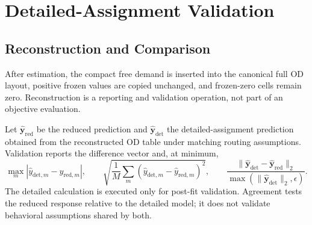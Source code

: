 
\section{Detailed-Assignment Validation}
\subsection{Reconstruction and Comparison}

After estimation, the compact free demand is inserted into the canonical full
OD layout, positive frozen values are copied unchanged, and frozen-zero cells
remain zero. Reconstruction is a reporting and validation operation, not part
of an objective evaluation.

Let $\widehat{\bm y}_{\mathrm{red}}$ be the reduced prediction and
$\widehat{\bm y}_{\mathrm{det}}$ the detailed-assignment prediction obtained
from the reconstructed OD table under matching routing assumptions. Validation
reports the difference vector and, at minimum,
\[
 \max_m|\widehat y_{\mathrm{det},m}-\widehat y_{\mathrm{red},m}|,
 \qquad
 \sqrt{\frac1M\sum_m
 (\widehat y_{\mathrm{det},m}-\widehat y_{\mathrm{red},m})^2},
 \qquad
 \frac{\|\widehat{\bm y}_{\mathrm{det}}-
              \widehat{\bm y}_{\mathrm{red}}\|_2}
      {\max(\|\widehat{\bm y}_{\mathrm{det}}\|_2,\epsilon)}.
\]
The detailed calculation is executed only for post-fit validation. Agreement
tests the reduced response relative to the detailed model; it does not validate
behavioral assumptions shared by both.
